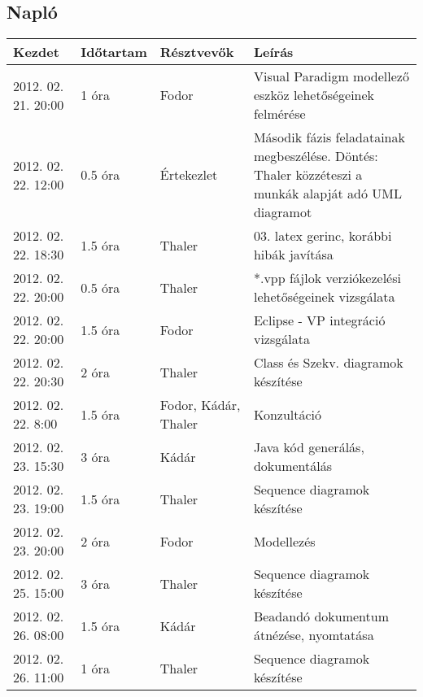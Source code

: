 		\begin{center}
			
		\end{center}
	
	\subsection{Napló}
    \begin{center} 
        \begin{tabular}{| l | p{1.9cm} | p{2.6cm} | p{6.1cm} |}
            \hline
                Kezdet & Időtartam & Résztvevők & Leírás \\
            \hline \hline 
2012. 02. 21. 20:00 & 1 óra & Fodor & Visual Paradigm modellező eszköz lehetőségeinek felmérése\\ \hline
2012. 02. 22. 12:00 & 0.5 óra & Értekezlet & Második fázis feladatainak megbeszélése. Döntés: Thaler közzéteszi a munkák alapját adó UML diagramot\\ \hline
2012. 02. 22. 18:30 & 1.5 óra & Thaler & 03. latex gerinc, korábbi hibák javítása\\ \hline
2012. 02. 22. 20:00 & 0.5 óra & Thaler & *.vpp fájlok verziókezelési lehetőségeinek vizsgálata\\ \hline
2012. 02. 22. 20:00 & 1.5 óra & Fodor & Eclipse - VP integráció vizsgálata\\ \hline
2012. 02. 22. 20:30 & 2 óra & Thaler & Class és Szekv. diagramok készítése\\ \hline
2012. 02. 22. 8:00 & 1.5 óra & Fodor, Kádár, Thaler & Konzultáció\\ \hline
2012. 02. 23. 15:30 & 3 óra & Kádár & Java kód generálás, dokumentálás\\ \hline
2012. 02. 23. 19:00 & 1.5 óra & Thaler & Sequence diagramok készítése\\ \hline
2012. 02. 23. 20:00 & 2 óra & Fodor & Modellezés\\ \hline
2012. 02. 25. 15:00 & 3 óra & Thaler & Sequence diagramok készítése\\ \hline
2012. 02. 26. 08:00 & 1.5 óra & Kádár & Beadandó dokumentum átnézése, nyomtatása\\ \hline
2012. 02. 26. 11:00 & 1 óra & Thaler & Sequence diagramok készítése\\ \hline

\end{tabular}
\end{center}
